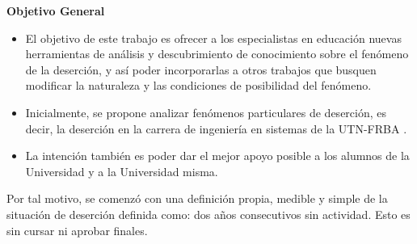 
\textbf{Objetivo General}\\
\begin{itemize}
	\item El objetivo de este trabajo es ofrecer a los especialistas en educación nuevas herramientas de análisis y descubrimiento de conocimiento sobre el fenómeno de la deserción, y así poder incorporarlas a otros trabajos que busquen modificar la naturaleza y las condiciones de posibilidad del fenómeno.
	\item Inicialmente, se propone analizar fenómenos particulares de deserción, es decir, la deserción en la carrera de ingeniería en sistemas de la UTN-FRBA .
	\item La intención también es poder dar el mejor apoyo posible a los alumnos de la Universidad y a la Universidad misma.
\end{itemize}

Por tal motivo, se comenzó con una definición propia, medible y
simple de la situación de deserción definida como: dos años consecutivos sin actividad. Esto es sin cursar ni aprobar finales.\\




